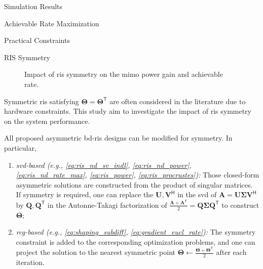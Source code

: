 \documentclass[journal]{IEEEtran}
\begin{document}
\begin{section}{Simulation Results}
\begin{subsection}{Achievable Rate Maximization}
	\end{subsection}

	\begin{subsection}{Practical Constraints}
		\begin{subsubsection}{RIS Symmetry}
			\label{sc:ris_symmetry}
			\begin{figure}[!t]
				\centering
				\caption{
					Impact of \gls{ris} symmetry on the \gls{mimo} power gain and achievable rate.
				}
			\end{figure}
			Symmetric \gls{ris} satisfying $\mathbf{\Theta} = \mathbf{\Theta}^\mathsf{T}$ are often considered in the literature due to hardware constraints.
			This study aim to investigate the impact of \gls{ris} symmetry on the system performance.
			\begin{remark}
				All proposed asymmetric \gls{bd}-\gls{ris} designs can be modified for symmetry. In particular,
				\begin{enumerate}[label=(\roman*)]
					\item \emph{\gls{svd}-based (e.g., \eqref{eq:ris_nd_sv_indl}, \eqref{eq:ris_nd_power}, \eqref{eq:ris_nd_rate_max}, \eqref{eq:ris_power}, \eqref{eq:ris_procrustes}):} Those closed-form asymmetric solutions are constructed from the product of singular matrices. If symmetry is required, one can replace the $\mathbf{U}, \mathbf{V}^\mathsf{H}$ in the \gls{svd} of $\mathbf{A} = \mathbf{U} \mathbf{\Sigma} \mathbf{V}^\mathsf{H}$ by $\mathbf{Q}, \mathbf{Q}^\mathsf{T}$ in the Autonne-Takagi factorization of $\frac{\mathbf{A} + \mathbf{A}^\mathsf{T}}{2} = \mathbf{Q} \mathbf{\Sigma} \mathbf{Q}^\mathsf{T}$ \cite{Ikramov2012} to construct $\mathbf{\Theta}$; \label{it:takagi}
					\item \emph{\gls{rcg}-based (e.g., \eqref{eq:shaping_subdiff}, \eqref{eq:gradient_eucl_rate}):} The symmetry constraint is added to the corresponding optimization problems, and one can project the solution to the nearest symmetric point $\mathbf{\Theta} \gets \frac{\mathbf{\Theta} + \mathbf{\Theta}^\mathsf{T}}{2}$ after each iteration. \label{it:projection}
				\end{enumerate}
			\end{remark}


\end{subsubsection}
\end{subsection}
\end{section}
\end{document}
